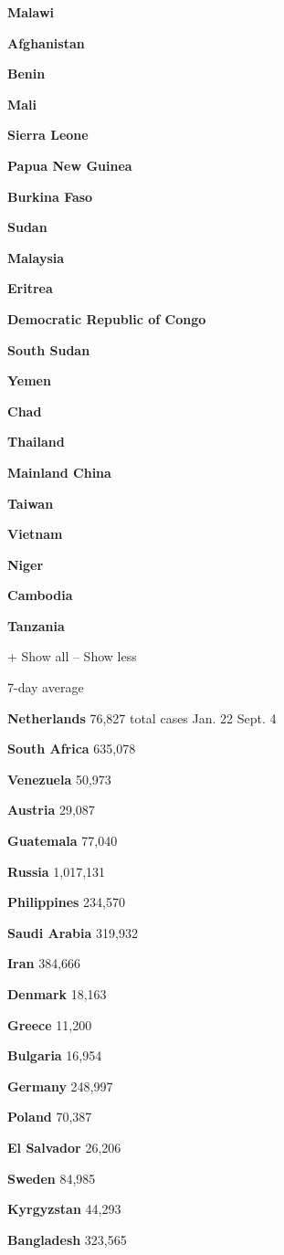 \textbf{Malawi}

\textbf{Afghanistan}

\textbf{Benin}

\textbf{Mali}

\textbf{Sierra Leone}

\textbf{Papua New Guinea}

\textbf{Burkina Faso}

\textbf{Sudan}

\textbf{Malaysia}

\textbf{Eritrea}

\textbf{Democratic Republic of Congo}

\textbf{South Sudan}

\textbf{Yemen}

\textbf{Chad}

\textbf{Thailand}

\textbf{Mainland China}

\textbf{Taiwan}

\textbf{Vietnam}

\textbf{Niger}

\textbf{Cambodia}

\textbf{Tanzania}

+ Show all -- Show less

7-day average

\textbf{Netherlands} 76,827 total cases Jan. 22 Sept. 4

\textbf{South Africa} 635,078

\textbf{Venezuela} 50,973

\textbf{Austria} 29,087

\textbf{Guatemala} 77,040

\textbf{Russia} 1,017,131

\textbf{Philippines} 234,570

\textbf{Saudi Arabia} 319,932

\textbf{Iran} 384,666

\textbf{Denmark} 18,163

\textbf{Greece} 11,200

\textbf{Bulgaria} 16,954

\textbf{Germany} 248,997

\textbf{Poland} 70,387

\textbf{El Salvador} 26,206

\textbf{Sweden} 84,985

\textbf{Kyrgyzstan} 44,293

\textbf{Bangladesh} 323,565

